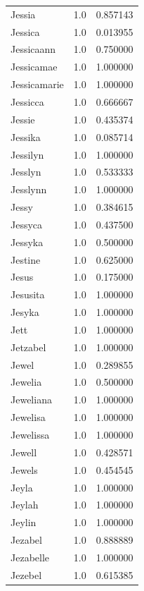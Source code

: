 \documentclass[
  letterpaper,
  DIV=11,
  numbers=noendperiod]{scrreprt}
\begin{document}
\begin{tabular}{lrr}
Jessia          &   1.0 &   0.857143 \\
Jessica         &   1.0 &   0.013955 \\
Jessicaann      &   1.0 &   0.750000 \\
Jessicamae      &   1.0 &   1.000000 \\
Jessicamarie    &   1.0 &   1.000000 \\
Jessicca        &   1.0 &   0.666667 \\
Jessie          &   1.0 &   0.435374 \\
Jessika         &   1.0 &   0.085714 \\
Jessilyn        &   1.0 &   1.000000 \\
Jesslyn         &   1.0 &   0.533333 \\
Jesslynn        &   1.0 &   1.000000 \\
Jessy           &   1.0 &   0.384615 \\
Jessyca         &   1.0 &   0.437500 \\
Jessyka         &   1.0 &   0.500000 \\
Jestine         &   1.0 &   0.625000 \\
Jesus           &   1.0 &   0.175000 \\
Jesusita        &   1.0 &   1.000000 \\
Jesyka          &   1.0 &   1.000000 \\
Jett            &   1.0 &   1.000000 \\
Jetzabel        &   1.0 &   1.000000 \\
Jewel           &   1.0 &   0.289855 \\
Jewelia         &   1.0 &   0.500000 \\
Jeweliana       &   1.0 &   1.000000 \\
Jewelisa        &   1.0 &   1.000000 \\
Jewelissa       &   1.0 &   1.000000 \\
Jewell          &   1.0 &   0.428571 \\
Jewels          &   1.0 &   0.454545 \\
Jeyla           &   1.0 &   1.000000 \\
Jeylah          &   1.0 &   1.000000 \\
Jeylin          &   1.0 &   1.000000 \\
Jezabel         &   1.0 &   0.888889 \\
Jezabelle       &   1.0 &   1.000000 \\
Jezebel         &   1.0 &   0.615385 \\

\end{tabular}
\end{document}
